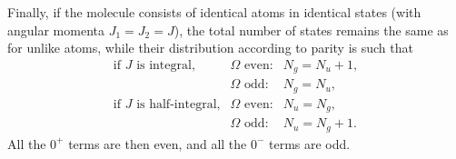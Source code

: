 Finally, if the molecule consists of identical atoms in identical states (with angular momenta $J_1=J_2=J$), the total number of states remains the same as for unlike atoms, while their distribution according to parity is such that
\[
\begin{array}{lll}
\text{if }J\text{ is integral,}&\Omega\text{ even:}&N_g=N_u+1,\\
&\Omega\text{ odd:}&N_g=N_u,\\
\text{if }J\text{ is half-integral,}&\Omega\text{ even:}&N_u=N_g,\\
&\Omega\text{ odd:}&N_u=N_g+1.
\end{array}
\]
All the $0^+$ terms are then even, and all the $0^-$ terms are odd.
